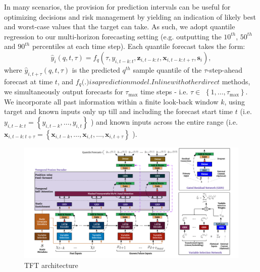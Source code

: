 \documentclass{apmcmthesis}
\begin{document}
In many scenarios, the provision for prediction intervals can be useful for optimizing decisions and risk management by yielding an indication of likely best and worst-case values that the target can take. As such, we adopt quantile regression to our multi-horizon forecasting setting (e.g. outputting the $10^{t h}$, $50^{t h}$ and $90^{t h}$ percentiles at each time step). Each quantile forecast takes the form:
$$
\hat{y}_i(q, t, \tau)=f_q\left(\tau, y_{i, t-k: t}, \boldsymbol{z}_{i, t-k: t}, \boldsymbol{x}_{i, t-k: t+\tau}, \boldsymbol{s}_i\right),
$$
where $\hat{y}_{i, t+\tau}(q, t, \tau)$ is the predicted $q^{t h}$ sample quantile of the $\tau$-step-ahead forecast at time $t$, and $f_q($.$) is a prediction model. In line with other direct$ methods, we simultaneously output forecasts for $\tau_{\max }$ time steps - i.e. $\tau \in$ $\left\{1, \ldots, \tau_{\max }\right\}$. We incorporate all past information within a finite look-back window $k$, using target and known inputs only up till and including the forecast start time $t$ (i.e. $y_{i, t-k: t}=\left\{y_{i, t-k}, \ldots, y_{i, t}\right\}$ ) and known inputs across the entire range (i.e. $\boldsymbol{x}_{i, t-k: t+\tau}=\left\{\boldsymbol{x}_{i, t-k}, \ldots, \boldsymbol{x}_{i, t}, \ldots, \boldsymbol{x}_{i, t+\tau}\right\}$ ).
\begin{figure}
    \centering
    \includegraphics[width=13cm]{APMCMThesis/figures/TFT.png}
    \caption{TFT architecture\cite{2}}
    
\end{figure}
\end{document}
